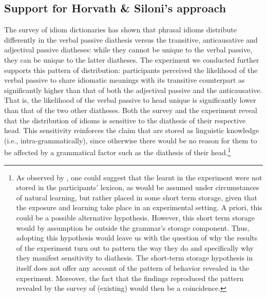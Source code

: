 \documentclass[output=paper]{langsci/langscibook}
\begin{document}
\subsection{Support for Horvath \& Siloni’s approach}  %

The survey of  idiom dictionaries has shown that phrasal idioms
distribute differently in the verbal passive diathesis versus the transitive,
anticausative and adjectival passive diatheses: while they cannot be unique to
the verbal passive, they can be unique to the latter diatheses. The experiment
we conducted further supports this pattern of distribution: participants
perceived the likelihood of the verbal passive to share idiomatic meanings with
its transitive counterpart as significantly higher than that of both the
adjectival passive and the anticausative. That is, the likelihood of the verbal
passive to head unique  is significantly lower than that of the two other
diatheses. Both the survey and the experiment reveal that the distribution of
idioms is sensitive to the diathesis of their respective head.  This
sensitivity reinforces the claim that  are stored as linguistic knowledge
(i.e., intra-grammatically), since otherwise there would be no reason for them
to be affected by a grammatical factor such as the diathesis of their
head.\footnote{As observed by \textcite{SilHorKluWex2018}, one could suggest that
    the learnt  in the experiment were not stored in the participants'
    lexicon, as would be assumed under circumstances of natural learning, but
    rather placed in some short term storage, given that the exposure and
    learning take place in an experimental setting. A priori, this could be a
    possible alternative hypothesis.  However, this short term storage would by
    assumption be outside the grammar’s storage component. Thus, adopting this
    hypothesis would leave us with the question of why the results of the
    experiment turn out to pattern the way they do and specifically why they
    manifest sensitivity to diathesis. The short-term storage hypothesis in
    itself does not offer any account of the pattern of behavior revealed in
    the experiment. Moreover, the fact that the findings reproduced the pattern
    revealed by the survey of (existing)  would then be a coincidence. }
\end{document}

